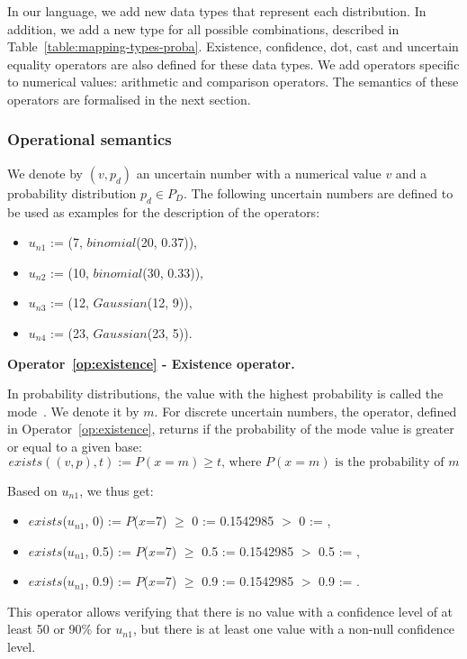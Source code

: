In our language, we add new data types that represent each distribution.
In addition, we add a new type for all possible combinations, described in Table~\ref{table:mapping-types-proba}.
Existence, confidence, dot, cast and uncertain equality operators are also defined for these data types.
We add operators specific to numerical values: arithmetic and comparison operators.
The semantics of these operators are formalised in the next section.	

\subsubsection{Operational semantics}
We denote by $(v, p_d)$ an uncertain number with a numerical value $v$ and a probability distribution $p_d \in P_D$.
The following uncertain numbers are defined to be used as examples for the description of the operators:
\begin{itemize}
    \item $u_{n1}$ := (7, $binomial$(20, 0.37)),
    \item $u_{n2}$ := (10, $binomial$(30, 0.33)),
    \item $u_{n3}$ := (12, $Gaussian$(12, 9)),
    \item $u_{n4}$ := (23, $Gaussian$(23, 5)).
\end{itemize}

\bigskip

\noindent\textbf{Operator~\ref{op:existence} - Existence operator.~}

In probability distributions, the value with the highest probability is called the mode~\cite{mood1963introduction}.
We denote it by $m$.
For discrete uncertain numbers, the operator, defined in Operator~\ref{op:existence}, returns \true{} if the probability of the mode value is greater or equal to a given base:
$$exists((v, p), t) := P(x=m)\geqslant t \text{, where $P(x=m)$ is the probability of $m$}$$

Based on $u_{n1}$, we thus get:
\begin{itemize}
    \item $exists$($u_{n1}$, 0) := $P$($x$=7) $\geqslant$ 0 := 0.1542985 $>$ 0 := \true{},
    \item $exists$($u_{n1}$, 0.5) := $P$($x$=7) $\geqslant$ 0.5 := 0.1542985 $>$ 0.5 := \false{},
    \item $exists$($u_{n1}$, 0.9) := $P$($x$=7) $\geqslant$ 0.9 := 0.1542985 $>$ 0.9 := \false{}.
\end{itemize}
This operator allows verifying that there is no value with a confidence level of at least 50 or 90\% for $u_{n1}$, but there is at least one value with a non-null confidence level.

